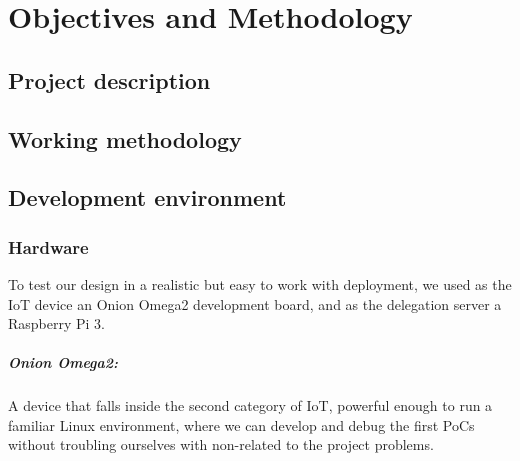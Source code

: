 \chapter{Objectives and Methodology}\label{ch:objandmeth}


\section{Project description}


\section{Working methodology}


\section{Development environment}


\subsection{Hardware}

To test our design in a realistic but easy  to work with deployment, we used as the \ac{IoT} device an Onion Omega2 development board, and as the delegation server a Raspberry Pi 3.


\paragraph{Onion Omega2:} A device that falls inside the second category of IoT, powerful enough to run a familiar Linux environment, where we can develop and debug the first \acp{PoC} without troubling ourselves with non-related to the project problems.

